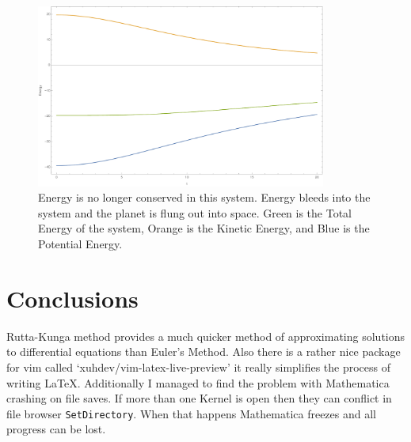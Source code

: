 \documentclass{article}
\begin{document}
\begin{figure}[!htb]
	\begin{center}
		\includegraphics[width=0.85\textwidth]{r3e.pdf}
	\end{center}
	\caption{Energy is no longer conserved in this system. Energy bleeds into the system and the planet is flung out into space. Green is the Total Energy of the system, Orange is the Kinetic Energy, and Blue is the Potential Energy.}
	\label{fig:r3e}
\end{figure}
\FloatBarrier


\section{Conclusions}

Rutta-Kunga method provides a much quicker method of approximating solutions to differential equations than Euler's Method. Also there is a rather nice package for vim called `xuhdev/vim-latex-live-preview' it really simplifies the process of writing \LaTeX. Additionally I managed to find the problem with Mathematica crashing on file saves. If more than one Kernel is open then they can conflict in file browser \texttt{SetDirectory}. When that happens Mathematica freezes and all progress can be lost.
\end{document}
